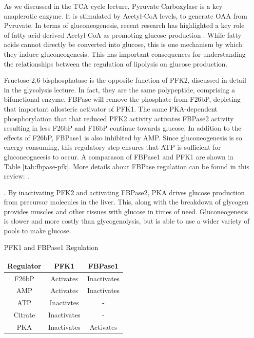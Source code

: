 \documentclass{tufte-handout}
\begin{document}
As we discussed in the TCA cycle lecture, Pyruvate Carboxylase is a key anaplerotic enzyme.  It is stimulated by Acetyl-CoA levels, to generate OAA from Pyruvate.  In terms of gluconeogenesis, recent research has highlighted a key role of fatty acid-derived Acetyl-CoA as promoting glucose production \cite{Perry2015}.  While fatty acids cannot directly be converted into glucose, this is one mechanism by which they induce gluconeogenesis.  This has important consequences for understanding the relationships between the regulation of lipolysis on glucose production.

  Fructose-2,6-bisphosphatase is the opposite function of PFK2, discussed in detail in the glycolysis lecture. In fact, they are the same polypeptide, comprising a bifunctional enzyme.  FBPase will remove the phosphate from F26bP, depleting that important allosteric activator of PFK1. The same PKA-dependent phosphorylation that that reduced PFK2 activity activates FBPase2 activity resulting in less F26bP and F16bP continue towards glucose.  In addition to the effects of F26bP, FBPase1 is also inhibited by AMP.  Since gluconeogenesis is so energy consuming, this regulatory step ensures that ATP is sufficient for gluconeogneesis to occur.  A comparason of FBPase1 and PFK1 are shown in Table \ref{tab:fbpase-pfk}.  More details about FBPase regulation can be found in this review: \citet{Okar2001}. 

.  By inactivating PFK2 and activating FBPase2, PKA drives glucose production from precursor molecules in the liver.  This, along with the breakdown of glycogen provides muscles and other tissues with glucose in times of need.  Gluconeogenesis is slower and more costly than glycogenolysis, but is able to use a wider variety of pools to make glucose.

\begin{margintable}
\centering
\caption{PFK1 and FBPase1 Regulation}
\label{tab:fbpase-pfk}
\begin{tabular}{ccc}
\hline
\textbf {Regulator} & \textbf{PFK1}  & \textbf{FBPase1} \\
\hline
F26bP & Activates & Inactivates\\
AMP & Activates & Inactivates \\
ATP & Inactivtes & - \\
Citrate & Inactivates & - \\
PKA & Inactivates & Activates\\
\hline
\end{tabular}
\end{margintable}
\end{document}
